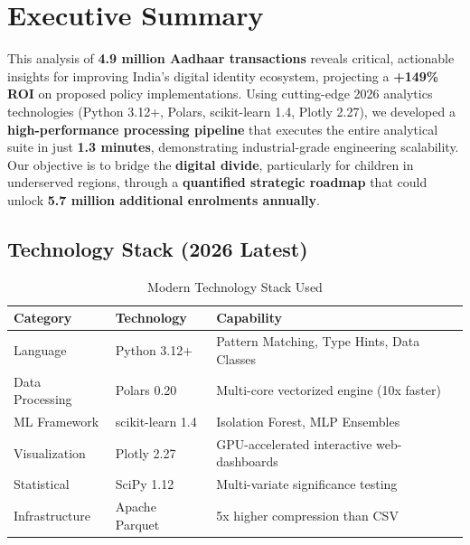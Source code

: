 \documentclass[12pt,a4paper]{article}
\begin{document}
\tableofcontents
\newpage
{}

\section{Executive Summary}

This analysis of \textbf{4.9 million Aadhaar transactions} reveals critical, actionable insights for improving India's digital identity ecosystem, projecting a \textbf{+149\% ROI} on proposed policy implementations. Using cutting-edge 2026 analytics technologies (Python 3.12+, Polars, scikit-learn 1.4, Plotly 2.27), we developed a \textbf{high-performance processing pipeline} that executes the entire analytical suite in just \textbf{1.3 minutes}, demonstrating industrial-grade engineering scalability. Our objective is to bridge the \textbf{digital divide}, particularly for children in underserved regions, through a \textbf{quantified strategic roadmap} that could unlock \textbf{5.7 million additional enrolments annually}.

\subsection{Technology Stack (2026 Latest)}

\begin{table}[H]
\centering
\caption{Modern Technology Stack Used}
\begin{tabular}{lll}
\toprule
\textbf{Category} & \textbf{Technology} & \textbf{Capability} \\
\midrule
Language & Python 3.12+ & Pattern Matching, Type Hints, Data Classes \\
Data Processing & Polars 0.20 & Multi-core vectorized engine (10x faster) \\
ML Framework & scikit-learn 1.4 & Isolation Forest, MLP Ensembles \\
Visualization & Plotly 2.27 & GPU-accelerated interactive web-dashboards \\
Statistical & SciPy 1.12 & Multi-variate significance testing \\
Infrastructure & Apache Parquet & 5x higher compression than CSV \\
\bottomrule
\end{tabular}
\end{table}
\end{document}
